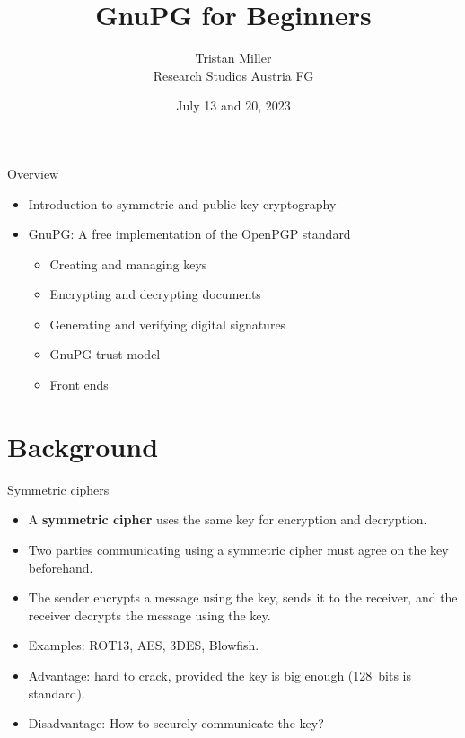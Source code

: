 \documentclass[
mode=present,
paper=smartboard,
size=20pt,
]{powerdot}
\title{GnuPG for Beginners}
\author{%
  Tristan Miller\\
  Research Studios Austria FG
}
\date{July 13 and 20, 2023}
\begin{document}
\maketitle

\begin{slide}[toc=]{Overview}
  \begin{itemize}
  \item Introduction to symmetric and public-key cryptography
  \item GnuPG: A free implementation of the OpenPGP standard
    \begin{itemize}
    \item Creating and managing keys
    \item Encrypting and decrypting documents
    \item Generating and verifying digital signatures
    \item GnuPG trust model
    \item Front ends
    \end{itemize}
  \end{itemize}
\end{slide}

\section{Background}
\begin{slide}{Symmetric ciphers}
  \begin{itemize}
  \item A \textbf{symmetric cipher} uses the same key for encryption
    and decryption.
  \item Two parties communicating using a symmetric cipher must agree
    on the key beforehand.
  \item The sender encrypts a message using the key,
    sends it to the receiver, and the receiver decrypts the message
    using the key.
  \item Examples: ROT13, AES, 3DES, Blowfish.
  \item Advantage: hard to crack, provided the key is big enough
    (128~bits is standard).
  \item Disadvantage: How to securely communicate the key?
  \end{itemize}
\end{slide}
\end{document}
